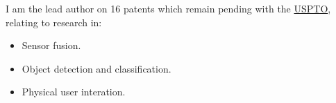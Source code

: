 \documentclass[12pt]{article}
\newcommand{\blockseparation}{\vspace{0.15in}}
\newenvironment{tightbullets}
{\begin{itemize}}
{\end{itemize}}
\newenvironment{bullets}
{\begin{tightbullets}}
{\end{tightbullets} \blockseparation}
\begin{document}
\begin{flushleft}
\blockseparation

I am the lead author on 16 patents which remain pending with the \href{http://patft.uspto.gov/netacgi/nph-Parser?Sect1=PTO2\&Sect2=HITOFF\&p=1\&u=\%2Fnetahtml\%2FPTO\%2Fsearch-bool.html\&r=0\&f=S\&l=50\&TERM1=McNamara\%2C+Alexander+Michael\&FIELD1=INNM\&co1=AND\&TERM2=\&FIELD2=\&d=PTXT}{USPTO}, relating to research in:
\begin{bullets}
	\item Sensor fusion.
	\item Object detection and classification.
	\item Physical user interation.
\end{bullets}

\end{flushleft}
\end{document}
